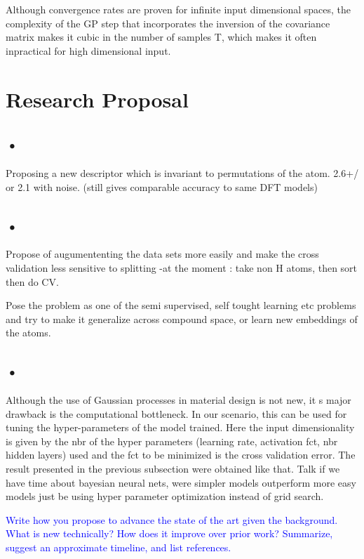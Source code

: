 \documentclass[10pt,journal,a4paper]{IEEEtran}
\begin{document}
Although convergence rates are proven for infinite input dimensional spaces, the complexity of the GP step that incorporates the inversion of the covariance matrix makes it cubic in the number of samples T, which makes it often inpractical for high dimensional input.

\section{Research Proposal}
\subsection{•}
Proposing a new descriptor which is invariant to permutations of the atom. 2.6+/ or 2.1 with noise. (still gives comparable accuracy to same DFT models)
\subsection{•}
Propose of augumententing the data sets more easily and make the cross validation
less sensitive to splitting -at the moment : take non H atoms, then sort then do CV.

Pose the problem as one of the semi supervised, self tought learning etc problems and try to make it generalize across compound space, or learn new embeddings of the atoms.
\subsection*{•}
Although the use of Gaussian processes in material design is not new, it s major drawback is the computational bottleneck. In our scenario, this can be used for
tuning the hyper-parameters of the model trained.
Here the input dimensionality is given by the nbr of the hyper parameters (learning rate, activation fct, nbr hidden layers) used and the fct to be minimized is the cross validation error.
The result presented in the previous subsection were obtained like that.
Talk if we have time about bayesian neural nets, were simpler models outperform more easy models just be using hyper parameter optimization instead of grid search.

 \textcolor{blue}{Write how you
propose to advance the state of the art given the background. What
is new technically? How does it improve over prior work?
Summarize, suggest an approximate timeline, and list references.}

\vspace{1cm}
\end{document}
